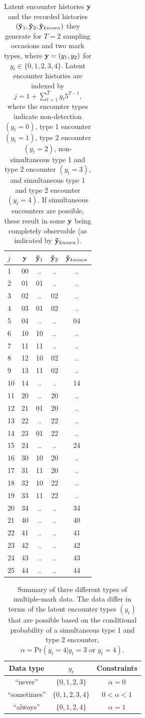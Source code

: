 \documentclass[12pt]{article}
\begin{document}
\begin{table}
  \caption{\label{tab:hist} Latent encounter histories ${\bf y}$ and the recorded histories $({\bf {\tilde y}}_1, {\bf {\tilde y}}_2, {\bf {\tilde y}}_{known})$ they generate for $T=2$ sampling occasions and two mark types, where ${\bf y}=\left(y_1,y_2\right)$ for $y_t \in \{0,1,2,3,4\}$. Latent encounter histories are indexed by $j=1+\sum_{t=1}^T y_t 5^{T-t}$, where the encounter types indicate non-detection $(y_t=0)$, type 1 encounter $(y_t=1)$, type 2 encounter $(y_t=2)$, non-simultaneous type 1 and type 2 encounter $(y_t=3)$, and simultaneous type 1 and type 2 encounter $(y_t=4)$. If simultaneous encounters are possible, these result in some ${\bf y}$ being completely observable (as indicated by ${\bf {\tilde y}}_{known}$).}
  \begin{tabular}{lc|ccc}
  \hline 
  $j$ & ${\bf y}$ & ${\bf {\tilde y}}_1$ &  ${\bf {\tilde y}}_2$ & ${\bf {\tilde y}}_{known}$ \tabularnewline
  \hline 
  1 & 00 & .. & .. & .. \tabularnewline
  2 & 01 & 01 & .. & .. \tabularnewline
  3 & 02 & .. & 02 & .. \tabularnewline
  4 & 03 & 01 & 02 & .. \tabularnewline
  5 & 04 & .. & .. & 04 \tabularnewline
  6 & 10 & 10 & .. & .. \tabularnewline
  7 & 11 & 11 & .. & .. \tabularnewline
  8 & 12 & 10 & 02 & .. \tabularnewline
  9 & 13 & 11 & 02 & .. \tabularnewline
  10 & 14 & .. & .. & 14 \tabularnewline
  11 & 20 & .. & 20 & .. \tabularnewline
  12 & 21 & 01 & 20 & .. \tabularnewline
  13 & 22 & .. & 22 & .. \tabularnewline
  14 & 23 & 01 & 22 & .. \tabularnewline
  15 & 24 & .. & .. & 24 \tabularnewline
  16 & 30 & 10 & 20 & .. \tabularnewline
  17 & 31 & 11 & 20 & .. \tabularnewline
  18 & 32 & 10 & 22 & .. \tabularnewline
  19 & 33 & 11 & 22 & .. \tabularnewline
  20 & 34 & .. & .. & 34 \tabularnewline
  21 & 40 & .. & .. & 40 \tabularnewline
  22 & 41 & .. & .. & 41 \tabularnewline
  23 & 42 & .. & .. & 42 \tabularnewline
  24 & 43 & .. & .. & 43 \tabularnewline
  25 & 44 & .. & .. & 44 \tabularnewline
  \hline 
  \end{tabular}
\end{table}

\clearpage

\begin{table}
  \caption{\label{tab:datatypes} Summary of three different types of multiple-mark data. The data differ in terms of the latent encounter types $(y_t)$ that are possible based on the conditional probability of a simultaneous type 1 and type 2 encounter, $\alpha = \text{Pr}\left( y_t=4|y_t=3 \text{ or } y_t=4 \right)$.}
  \begin{tabular}{c|cc}
  \hline 
  Data type & $y_t$ &  Constraints \tabularnewline
  \hline 
  ``never'' & $\{0,1,2,3\}$ & $\alpha=0$ \tabularnewline
  ``sometimes'' & $\{0,1,2,3,4\}$ & $0<\alpha<1$ \tabularnewline
  ``always'' & $\{0,1,2,4\}$ & $\alpha=1$ \tabularnewline
  \hline 
  \end{tabular}
\end{table}
\end{document}
